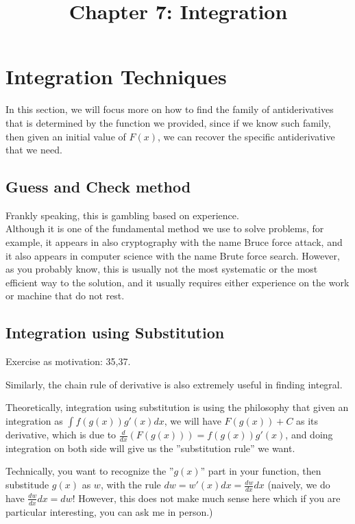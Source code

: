 \documentclass[12pt]{article}
\date{}
\title{Chapter 7: Integration}
\theoremstyle{definition}
\theoremstyle{definition}
\theoremstyle{remark}
\theoremstyle{definition}
\theoremstyle{definition}
\theoremstyle{definition}
\begin{document}
\maketitle




\section{Integration Techniques}

In this section, we will focus more on how to find the family of antiderivatives that is determined by the function we provided, since if we know such family, then given an initial value of $F(x)$, we can recover the specific antiderivative that we need.

\subsection{Guess and Check method}

Frankly speaking, this is gambling based on experience.\\
Although it is one of the fundamental method we use to solve problems, for example, it appears in also cryptography with the name Bruce force attack, and it also appears in computer science with the name Brute force search. However, as you probably know, this is usually not the most systematic or the most efficient way to the solution, and it usually requires either experience on the work or machine that do not rest. 

\subsection{Integration using Substitution}
Exercise as motivation:  35,37.

Similarly, the chain rule of derivative is also extremely useful in finding integral.

Theoretically, integration using substitution is using the philosophy that given an integration as $\int f(g(x)) g'(x) dx$, we will have $F(g(x))+C$ as its derivative, which is due to $\frac{d}{dx}(F(g(x))) = f(g(x))g'(x)$, and doing integration on both side will give us the ''substitution rule'' we want.

Technically, you want to recognize the ''$g(x)$'' part in your function, then substitude $g(x)$ as $w$, with the rule $dw=w'(x)dx =\frac{dw}{dx} dx$ (naively, we do have $\frac{dw}{dx} dx =dw$! However, this does not make much sense here which if you are particular interesting, you can ask me in person.)
\end{document}
